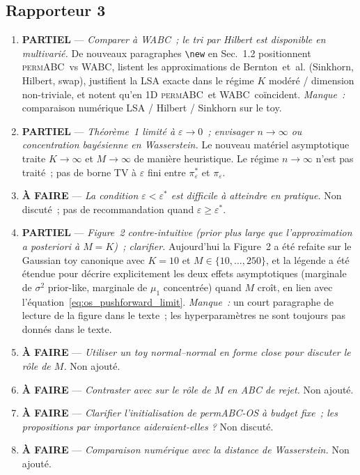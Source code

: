 \documentclass[11pt]{article}
\newcommand{\permABC}{\textsc{permABC}}
\newcommand{\WABC}{\textsc{WABC}}
\begin{document}
\subsection*{Rapporteur 3}
\begin{enumerate}[leftmargin=*]
    \item \textcolor{orange!85!black}{\textbf{PARTIEL}} --- \emph{Comparer à WABC~; le tri par
    Hilbert est disponible en multivarié.} De nouveaux paragraphes \texttt{\textbackslash new}
    en Sec.~1.2 positionnent \permABC\ vs \WABC, listent les approximations de Bernton~et~al.
    (Sinkhorn, Hilbert, swap), justifient la LSA exacte dans le régime $K$ modéré / dimension
    non-triviale, et notent qu'en 1D \permABC\ et \WABC\ coïncident.
    \emph{Manque~:} comparaison numérique LSA / Hilbert / Sinkhorn sur le toy.
    \item \textcolor{orange!85!black}{\textbf{PARTIEL}} --- \emph{Théorème~1 limité à
    $\varepsilon\to0$~; envisager $n\to\infty$ ou concentration bayésienne en Wasserstein.} Le
    nouveau matériel asymptotique traite $K\to\infty$ et $M\to\infty$ de manière heuristique.
    Le régime $n\to\infty$ n'est pas traité~; pas de borne TV à $\varepsilon$ fini entre
    $\pi_\varepsilon^*$ et $\pi_\varepsilon$.
    \item \textcolor{red!70!black}{\textbf{À FAIRE}} --- \emph{La condition $\varepsilon<\varepsilon^*$
    est difficile à atteindre en pratique.} Non discuté~; pas de recommandation quand
    $\varepsilon\geq\varepsilon^*$.
    \item \textcolor{orange!85!black}{\textbf{PARTIEL}} --- \emph{Figure~2 contre-intuitive
    (prior plus large que l'approximation a posteriori à $M=K$)~; clarifier.} Aujourd'hui la
    Figure~2 a été refaite sur le Gaussian toy canonique avec $K=10$ et $M\in\{10,\dots,250\}$,
    et la légende a été étendue pour décrire explicitement les deux effets asymptotiques
    (marginale de $\sigma^2$ prior-like, marginale de $\mu_1$ concentrée) quand $M$ croît, en
    lien avec l'équation~\eqref{eq:os_pushforward_limit}. \emph{Manque~:} un court paragraphe
    de lecture de la figure dans le texte~; les hyperparamètres ne sont toujours pas donnés dans
    le texte.
    \item \textcolor{red!70!black}{\textbf{À FAIRE}} --- \emph{Utiliser un toy normal--normal en
    forme close pour discuter le rôle de $M$.} Non ajouté.
    \item \textcolor{red!70!black}{\textbf{À FAIRE}} --- \emph{Contraster avec
    \cite*{bornn2017use} sur le rôle de $M$ en ABC de rejet.} Non ajouté.
    \item \textcolor{red!70!black}{\textbf{À FAIRE}} --- \emph{Clarifier l'initialisation de
    permABC-OS à budget fixe~; les propositions par importance aideraient-elles ?} Non discuté.
    \item \textcolor{red!70!black}{\textbf{À FAIRE}} --- \emph{Comparaison numérique avec la
    distance de Wasserstein.} Non ajouté.
\end{enumerate}
\end{document}
